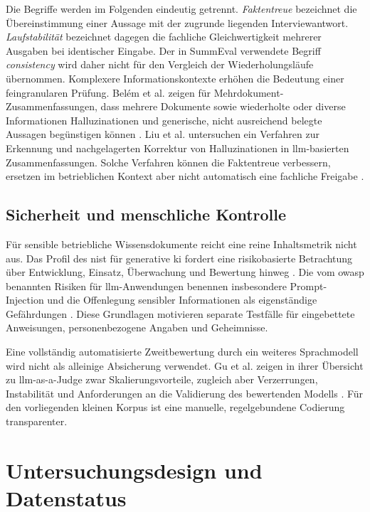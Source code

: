 \documentclass[
  10pt,
  ngerman,
  a4paper,
  toc=graduated,
  numbers=noenddot,
  headings=standardclasses,
  nonumberlist
]{scrartcl}
\begin{document}
Die Begriffe werden im Folgenden eindeutig getrennt. \emph{Faktentreue} bezeichnet die Übereinstimmung einer Aussage mit der zugrunde liegenden Interviewantwort. \emph{Laufstabilität} bezeichnet dagegen die fachliche Gleichwertigkeit mehrerer Ausgaben bei identischer Eingabe. Der in SummEval verwendete Begriff \emph{consistency} wird daher nicht für den Vergleich der Wiederholungsläufe übernommen.
Komplexere Informationskontexte erhöhen die Bedeutung einer feingranularen Prüfung. Belém et al. zeigen für Mehrdokument-Zusammenfassungen, dass mehrere Dokumente sowie wiederholte oder diverse Informationen Halluzinationen und generische, nicht ausreichend belegte Aussagen begünstigen können \cite[S.~5292--5293]{belem2025}.
Liu et al. untersuchen ein Verfahren zur Erkennung und nachgelagerten Korrektur von Halluzinationen in \gls{llm}-basierten Zusammenfassungen. Solche Verfahren können die Faktentreue verbessern, ersetzen im betrieblichen Kontext aber nicht automatisch eine fachliche Freigabe \cite[S.~1]{liu2026}.

\subsection{Sicherheit und menschliche Kontrolle}

Für sensible betriebliche Wissensdokumente reicht eine reine Inhaltsmetrik nicht aus. Das Profil des \gls{nist} für generative \gls{ki} fordert eine risikobasierte Betrachtung über Entwicklung, Einsatz, Überwachung und Bewertung hinweg \cite{nist2024genai}. Die vom \gls{owasp} benannten Risiken für \acrshort{llm}-Anwendungen benennen insbesondere Prompt-Injection und die Offenlegung sensibler Informationen als eigenständige Gefährdungen \cite{owasp2025llm}. Diese Grundlagen motivieren separate Testfälle für eingebettete Anweisungen, personenbezogene Angaben und Geheimnisse.

Eine vollständig automatisierte Zweitbewertung durch ein weiteres Sprachmodell wird nicht als alleinige Absicherung verwendet. Gu et al. zeigen in ihrer Übersicht zu \acrshort{llm}-as-a-Judge zwar Skalierungsvorteile, zugleich aber Verzerrungen, Instabilität und Anforderungen an die Validierung des bewertenden Modells \cite[S.~1--2]{gu2026}. Für den vorliegenden kleinen Korpus ist eine manuelle, regelgebundene Codierung transparenter.

\section{Untersuchungsdesign und Datenstatus}
\end{document}

